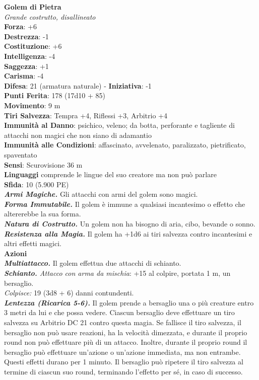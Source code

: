 \begin{multicols}{2}
\medskip\textbf{Golem di Pietra}\\
\emph{Grande costrutto, disallineato}\\
\textbf{Forza}: +6 \\
\textbf{Destrezza}: -1\\
\textbf{Costituzione}: +6\\
\textbf{Intelligenza}: -4\\
\textbf{Saggezza}: +1\\
\textbf{Carisma}: -4\\
\textbf{Difesa}: 21 (armatura naturale) - \textbf{Iniziativa}: -1\\
\textbf{Punti Ferita}: 178 (17d10 + 85)\\
\textbf{Movimento}: 9 m\\
\textbf{Tiri Salvezza}: Tempra +4, Riflessi +3, Arbitrio +4\\
\textbf{Immunità al Danno}: psichico, veleno; da botta, perforante e tagliente di attacchi non magici che non siano di adamantio\\
\textbf{Immunità alle Condizioni}: affascinato, avvelenato, paralizzato, pietrificato, spaventato\\
\textbf{Sensi}: Scurovisione 36 m\\
\textbf{Linguaggi} comprende le lingue del suo creatore ma non può parlare\\
\textbf{Sfida}: 10 (5.900 PE)\smallskip\\
\emph{\textbf{Armi Magiche.}} Gli attacchi con armi del golem sono magici.\\
\emph{\textbf{Forma Immutabile.}} Il golem è immune a qualsiasi incantesimo o effetto che altererebbe la sua forma.\\
\emph{\textbf{Natura di Costrutto.}} Un golem non ha bisogno di aria, cibo, bevande o sonno.\\
\emph{\textbf{Resistenza alla Magia.}} Il golem ha +1d6 ai tiri salvezza contro incantesimi e altri effetti magici.\\
\smallskip\textbf{Azioni} \\
\emph{\textbf{Multiattacco.}} Il golem effettua due attacchi di schianto.\\
\emph{\textbf{Schianto.} Attacco con arma da mischia}: +15 al colpire, portata 1 m, un bersaglio.\\
\emph{Colpisce:} 19 (3d8 + 6) danni contundenti.\\
\emph{\textbf{Lentezza (Ricarica 5-6).}} Il golem prende a bersaglio una o più creature entro 3 metri da lui e che possa vedere. Ciascun bersaglio deve effettuare un tiro salvezza su Arbitrio DC  21 contro questa magia. Se fallisce il tiro salvezza, il bersaglio non può usare reazioni, ha la velocità dimezzata, e durante il proprio round non può effettuare più di un attacco. Inoltre,  durante il proprio round il bersaglio può effettuare un'azione o un'azione immediata, ma non entrambe. Questi effetti durano per 1 minuto. Il bersaglio può ripetere il tiro salvezza al termine di ciascun suo round, terminando l'effetto per sé, in caso di successo.\\

\end{multicols}
